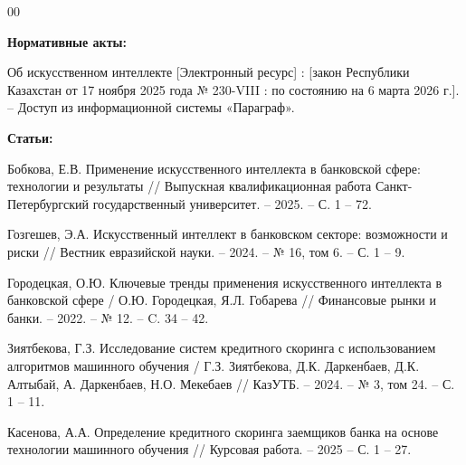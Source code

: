 \begin{thebibliography}{00}
	
	\makeatletter
	\renewcommand\@biblabel[1]{#1}
	\makeatother	
	\bibitem[]{} \textbf{{\large Нормативные акты:}}
	\makeatletter
	\renewcommand\@biblabel[1]{#1.}
	\makeatother
	
	 Об искусственном интеллекте [Электронный ресурс] : [закон Республики Казахстан от 17 ноября 2025 года № 230-VIII : по состоянию на 6 марта 2026 г.]. – Доступ из информационной системы «Параграф».
	
	
	
	\makeatletter
	\renewcommand\@biblabel[1]{#1}
	\makeatother	
	\bibitem[]{} \textbf{{\large Статьи:}}
	\makeatletter
	\renewcommand\@biblabel[1]{#1.}
	\makeatother	
	
	 Бобкова, Е.В. Применение искусственного интеллекта в банковской сфере: технологии и результаты // Выпускная квалификационная работа Санкт-Петербургский государственный университет. -- 2025. -- С. 1 -- 72.
	
	 Гозгешев, Э.А. Искусственный интеллект в банковском секторе: возможности и риски // Вестник евразийской науки. – 2024. – № 16, том 6. – С. 1 – 9.
	
	 Городецкая, О.Ю. Ключевые тренды применения искусственного интеллекта в банковской сфере / О.Ю. Городецкая, Я.Л. Гобарева // Финансовые рынки и банки. -- 2022. -- № 12. -- C. 34 -- 42.
	
	 Зиятбекова, Г.З. Исследование систем кредитного скоринга с использованием алгоритмов машинного обучения / Г.З. Зиятбекова, Д.К. Даркенбаев, Д.К. Алтыбай, А. Даркенбаев, Н.О. Мекебаев // КазУТБ. -- 2024. -- № 3, том 24. -- С. 1 -- 11.
	
	 Касенова, А.А. Определение кредитного скоринга заемщиков банка на основе технологии машинного обучения // Курсовая работа. -- 2025 -- С. 1 -- 27.
	

\end{thebibliography}

